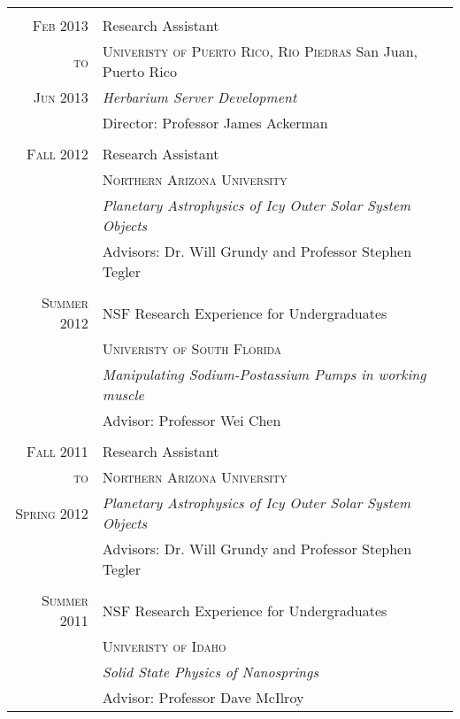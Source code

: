 \documentclass[letterpaper,10pt]{article} %
\begin{document}
\begin{tabularx}{\textwidth}{r|p{11cm}}
\multicolumn{2}{c}{} \\


\textsc{Feb 2013} & Research Assistant  \\
\textsc{to} & \textsc{Univeristy of Puerto Rico, Rio Piedras} San Juan, Puerto Rico\\
\textsc{Jun 2013} & \emph{Herbarium Server Development}\\ 
 & Director: Professor James Ackerman \\
\multicolumn{2}{c}{}\\


\textsc{Fall 2012} & Research Assistant \\
& \textsc{Northern Arizona University} \\
&\emph{Planetary Astrophysics of Icy Outer Solar System Objects}\\ 
& Advisors: Dr. Will Grundy and Professor Stephen Tegler \\
\multicolumn{2}{c}{} \\


\textsc{Summer 2012} & NSF Research Experience for Undergraduates \\
& \textsc{Univeristy of South Florida} \\
&\emph{Manipulating Sodium-Postassium Pumps in working muscle}\\ 
& Advisor: Professor Wei Chen \\
\multicolumn{2}{c}{} \\


\textsc{Fall 2011} & Research Assistant \\
\textsc{to} & \textsc{Northern Arizona University} \\
\textsc{Spring 2012} &\emph{Planetary Astrophysics of Icy Outer Solar System Objects}\\ 
& Advisors: Dr. Will Grundy and Professor Stephen Tegler \\
\multicolumn{2}{c}{} \\


\textsc{Summer 2011} & NSF Research Experience for Undergraduates \\
& \textsc{Univeristy of Idaho} \\
&\emph{Solid State Physics of Nanosprings}\\ 
& Advisor: Professor Dave McIlroy \\


\end{tabularx}
\end{document}
